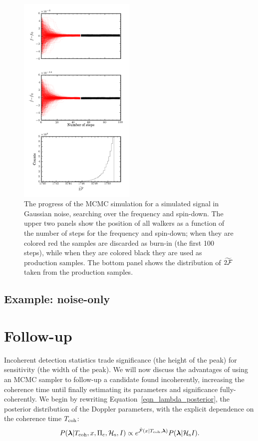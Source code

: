 \documentclass[aps, prd, twocolumn, superscriptaddress, floatfix, showpacs, nofootinbib, longbibliography]{revtex4-1}
\begin{document}
\begin{figure}[htb]
\centering
\includegraphics[width=0.5\textwidth]{fully_coherent_search_using_MCMC_walkers}
\caption{The progress of the MCMC simulation for a simulated signal in Gaussian
noise, searching over the frequency and spin-down. The upper two panels show
the position of all walkers as a function of the number of steps for the
frequency and spin-down; when they are colored red the samples are discarded as
burn-in (the first 100 steps), while when they are colored black they are used
as production samples. The bottom panel shows the distribution of
$\widetilde{2{\mathcal{F}}}$ taken from the production samples.}
\label{fig_MCMC_simple_example}
\end{figure}

\subsection{Example: noise-only}

\section{Follow-up}
\label{sec_follow_up}

Incoherent detection statistics trade significance (the height of the peak) for
sensitivity (the width of the peak). We will now discuss the advantages of
using an MCMC sampler to follow-up a candidate found incoherently, increasing
the coherence time until finally estimating its parameters and significance
fully-coherently. We begin by rewriting Equation~\eqref{eqn_lambda_posterior},
the posterior distribution of the Doppler parameters, with the explicit
dependence on the coherence time $T_{\rm coh}$:
\begin{equation}
P(\boldsymbol{\mathbf{\lambda}} | T_{\rm coh}, x, \Pi_{\rm c}, \mathcal{H}_{\rm s}, I)
\propto e^{\hat{{\mathcal{F}}}(x| T_{\rm coh}, \boldsymbol{\mathbf{\lambda}})} P(\boldsymbol{\mathbf{\lambda}}| \mathcal{H}_{\rm s} I).
\end{equation}
\end{document}
